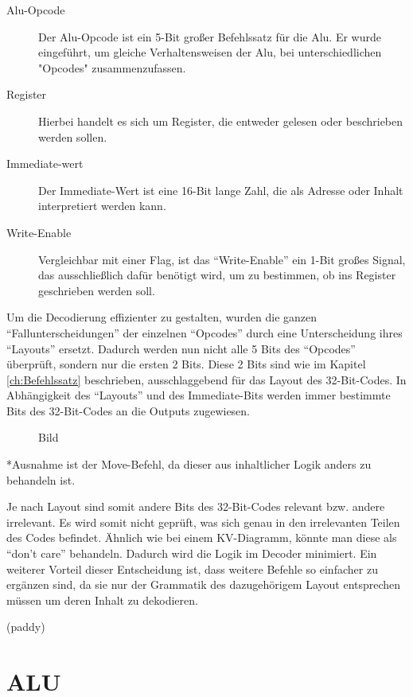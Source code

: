 \documentclass[paper=a4,fontsize=12pt,twocolumn]{scrreprt}
\begin{document}
\begin{description}
  \item [Alu-Opcode] Der Alu-Opcode ist ein 5-Bit großer Befehlssatz für die Alu.
  Er wurde eingeführt, um gleiche Verhaltensweisen der Alu, bei unterschiedlichen "Opcodes" zusammenzufassen.
  \item [Register] Hierbei handelt es sich um Register, die entweder gelesen oder beschrieben werden sollen.
  \item [Immediate-wert] Der Immediate-Wert ist eine 16-Bit lange Zahl, die als Adresse oder Inhalt interpretiert werden kann.
  \item [Write-Enable] Vergleichbar mit einer Flag, ist das \enquote{Write-Enable} ein 1-Bit großes Signal, das ausschließlich dafür benötigt wird, um zu bestimmen, ob ins Register geschrieben werden soll.
\end{description}

Um die Decodierung effizienter zu gestalten, wurden die ganzen \enquote{Fallunterscheidungen} der einzelnen \enquote{Opcodes} durch eine Unterscheidung ihres \enquote{Layouts} ersetzt.
Dadurch werden nun nicht alle 5 Bits des \enquote{Opcodes} überprüft, sondern nur die ersten 2 Bits.
Diese 2 Bits sind wie im Kapitel \ref{ch:Befehlssatz} beschrieben, ausschlaggebend für das Layout des 32-Bit-Codes.
In Abhängigkeit des \enquote{Layouts} und des Immediate-Bits werden immer bestimmte Bits des 32-Bit-Codes an die Outputs zugewiesen.

\begin{figure}[h]
\centering
\caption{Bild}
\end{figure}

*Ausnahme ist der Move-Befehl, da dieser aus inhaltlicher Logik anders zu behandeln ist.

Je nach Layout sind somit andere Bits des 32-Bit-Codes relevant bzw. andere irrelevant.
Es wird somit nicht geprüft, was sich genau in den irrelevanten Teilen des Codes befindet.
Ähnlich wie bei einem KV-Diagramm, könnte man diese als  \enquote{don't care} behandeln.
Dadurch wird die Logik im Decoder minimiert. 
Ein weiterer Vorteil dieser Entscheidung ist, dass weitere Befehle so einfacher zu ergänzen sind, da sie nur der Grammatik des dazugehörigem Layout entsprechen müssen um deren Inhalt zu dekodieren.  


(paddy)

\section{ALU}
\end{document}

